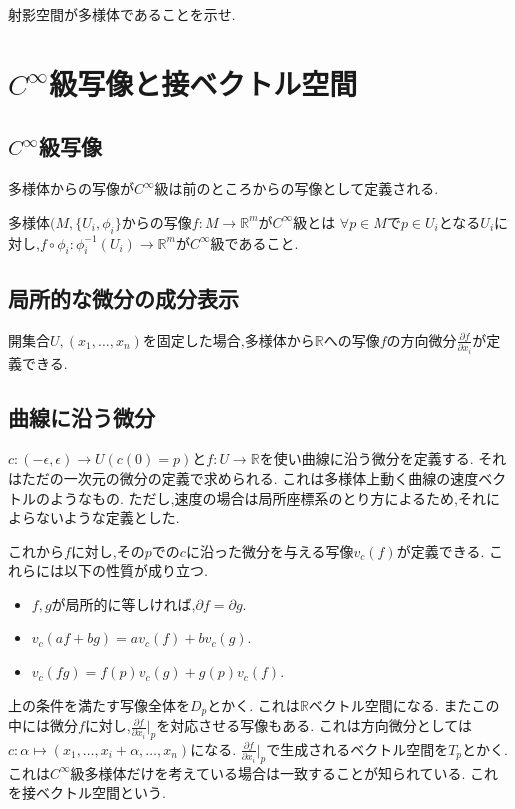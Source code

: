 \documentclass[dvipdfmx]{jarticle}
\begin{document}
\begin{exs}
射影空間が多様体であることを示せ.
\end{exs}

\section{$C^{\infty}$級写像と接ベクトル空間}
\subsection{$C^{\infty}$級写像}
多様体からの写像が$C^{\infty}$級は前のところからの写像として定義される.
\begin{screen}
\begin{dfn}
多様体$(M, \{U_i, \phi_i\}$からの写像$f:M \to \mathbb{R}^m$が$C^{\infty}$級とは
$\forall p \in M$で$p \in U_i$となる$U_i$に対し,$f \circ \phi_i: \phi_i^{-1}(U_i) \to \mathbb{R}^m$が$C^{\infty}$級であること.
\end{dfn}
\end{screen}

\subsection{局所的な微分の成分表示}
開集合$U, (x_1,\dots,x_n)$を固定した場合,多様体から$\mathbb{R}$への写像$f$の方向微分$\frac{\partial f}{\partial x_i}$が定義できる.

\subsection{曲線に沿う微分}
$c: (- \epsilon , \epsilon) \to U(c(0)=p)$と$f:U \to \mathbb{R}$を使い曲線に沿う微分を定義する.
それはただの一次元の微分の定義で求められる.
これは多様体上動く曲線の速度ベクトルのようなもの.
ただし,速度の場合は局所座標系のとり方によるため,それによらないような定義とした.

これから$f$に対し,その$p$での$c$に沿った微分を与える写像$v_c(f)$が定義できる.
これらには以下の性質が成り立つ.
\begin{itemize}
  \item $f,g$が局所的に等しければ,$\partial f = \partial g$.
  \item $v_c(af + bg)= av_c(f) + bv_c(g)$.
  \item $v_c(fg) = f(p)v_c(g) + g(p)v_c(f)$.
\end{itemize}

上の条件を満たす写像全体を$D_p$とかく.
これは$\mathbb{R}$ベクトル空間になる.
またこの中には微分$f$に対し,$\frac{\partial f}{\partial x_i}|_p$を対応させる写像もある.
これは方向微分としては$c: \alpha  \mapsto (x_1, \ldots, x_i + \alpha, \ldots, x_n)$になる.
$\frac{\partial f}{\partial x_i}|_p$で生成されるベクトル空間を$T_p$とかく.
これは$C^{\infty}$級多様体だけを考えている場合は一致することが知られている.
これを接ベクトル空間という.
\end{document}
